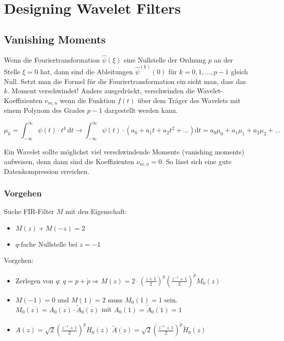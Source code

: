 \section{Designing Wavelet Filters}
\subsection{Vanishing Moments}
 Wenn die Fouriertransformation $\hat{\psi}(\xi)$ eine Nullstelle der Ordnung $p$ an der Stelle $\xi = 0$ hat, dann sind die Ableitungen $\hat{\psi}^{(k)}(0)$ für $k=0,1,...,p-1$ gleich Null. Setzt man die Formel für die Fouriertransformation ein sieht man, dass das $k$. Moment verschwindet! Anders ausgedrückt, verschwinden die Wavelet-Koeffizienten $v_{m,n}$ wenn die Funktion $f(t)$ über dem Träger des Wavelets mit einem Polynom des Grades $p-1$ dargestellt werden kann. 

\[ 
	\mu_k = \int_{-\infty}^{\infty} \psi(t) \cdot t^k \, \mathrm{d}t \longrightarrow 
	\int_{-\infty}^{\infty} \psi(t) \cdot (a_0 + a_1t + a_2t^2 + \hdots) \mathrm{d}t = a_0\mu_0 + a_1\mu_1 + a_2\mu_2 + \hdots
\]

Ein Wavelet sollte möglichst viel verschwindende Momente (vanishing moments) aufweisen, denn dann sind die Koeffizienten $\nu_{m,n} = 0$. So lässt sich eine gute Datenkompression erreichen.


\subsubsection{Vorgehen}
Suche FIR-Filter $M$ mit den Eigenschaft: 

\vspace{-0.4cm}

\begin{itemize}
	\itemsep-0.2cm
	\item $M(z) + M(-z)=2$
	\item $q$-fache Nullstelle bei $z=-1$
\end{itemize}

Vorgehen:

\vspace{-0.4cm}

\begin{itemize}
	\itemsep-0.2cm
	\item Zerlegen von $q$: $q = p + \tilde{p} \Rightarrow M(z)=2\cdot (\frac{z+1}{2})^p (\frac{z^{-1}+1}{2})^{\tilde{p}}M_0(z)$
	\item $M(-1)=0$ und $M(1) = 2$ muss $M_0(1)=1$ sein. $M_0(z) = A_0(z) \cdot \tilde{A}_0(z)$ mit $A_0(1)=\tilde{A}_0(1) = 1$
	\item $A(z) = \sqrt{2}(\frac{z^{-1}+1}{2})^p H_0(z)$ \qquad $\tilde{A}(z) = \sqrt{2}(\frac{z^{-1}+1}{2})^{\tilde{p}} \tilde{H}_0(z)$
\end{itemize}

